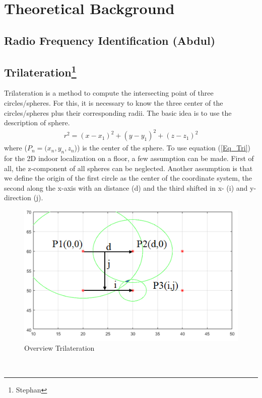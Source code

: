 \section{Theoretical Background} 

\subsection{Radio Frequency Identification (Abdul) }

\subsection[Trilateration]{Trilateration\footnote{Stephan}}
Trilateration is a method to compute the intersecting point of three circles/spheres. For this, it is necessary to know the three center of the circles/spheres plus their corresponding radii. The basic idea is to use the description of sphere\cite{Cotera.2016}.
\begin{align}\label{Eq_Tri}
r^2 = (x-x_1)^2 + (y-y_1)^2 + (z-z_1)^2  
\end{align} 
where ($P_n=(x_n,y_n,z_n$)) is the center of the sphere. To use equation (\ref{Eq_Tri}) for the 2D indoor localization on a floor, a few assumption can be made. First of all, the z-component of all spheres can be neglected. Another assumption is that we define the origin of the first circle as the center of the coordinate system, the second along the x-axis with an distance (d) and the third shifted in x- (i) and y-direction (j). 
\begin{figure}[!htbp]
 \centering
 \includegraphics[width = 13cm]{Pictures/Trilateration_1}
 \caption{Overview Trilateration}
 \label{Tri_1}
 \end{figure}\\ 
